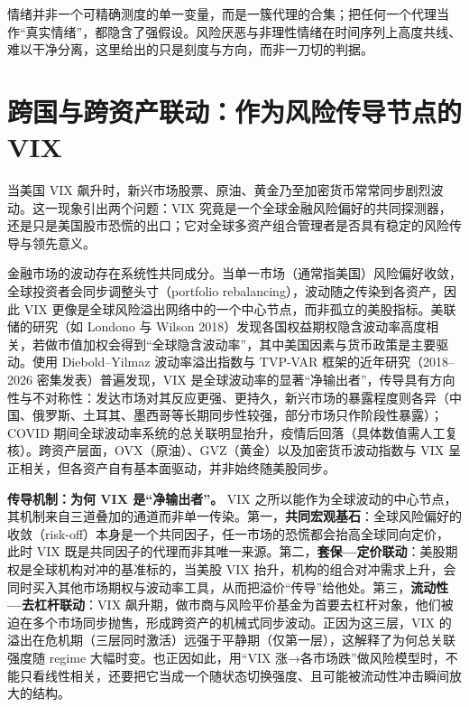 \documentclass[11pt,a4paper]{ctexart}
\begin{document}
情绪并非一个可精确测度的单一变量，而是一簇代理的合集；把任何一个代理当作“真实情绪”，都隐含了强假设。风险厌恶与非理性情绪在时间序列上高度共线、难以干净分离，这里给出的只是刻度与方向，而非一刀切的判据。

\section{跨国与跨资产联动：作为风险传导节点的 VIX}

当美国 VIX 飙升时，新兴市场股票、原油、黄金乃至加密货币常常同步剧烈波动。这一现象引出两个问题：VIX 究竟是一个全球金融风险偏好的共同探测器，还是只是美国股市恐慌的出口；它对全球多资产组合管理者是否具有稳定的风险传导与领先意义。

金融市场的波动存在系统性共同成分。当单一市场（通常指美国）风险偏好收敛，全球投资者会同步调整头寸（portfolio rebalancing），波动随之传染到各资产，因此 VIX 更像是全球风险溢出网络中的一个中心节点，而非孤立的美股指标。美联储的研究（如 Londono 与 Wilson 2018）发现各国权益期权隐含波动率高度相关，若做市值加权会得到“全球隐含波动率”，其中美国因素与货币政策是主要驱动。使用 Diebold–Yilmaz 波动率溢出指数与 TVP-VAR 框架的近年研究（2018–2026 密集发表）普遍发现，VIX 是全球波动率的显著“净输出者”，传导具有方向性与不对称性：发达市场对其反应更强、更持久，新兴市场的暴露程度则各异（中国、俄罗斯、土耳其、墨西哥等长期同步性较强，部分市场只作阶段性暴露）；COVID 期间全球波动率系统的总关联明显抬升，疫情后回落（具体数值需人工复核）。跨资产层面，OVX（原油）、GVZ（黄金）以及加密货币波动指数与 VIX 呈正相关，但各资产自有基本面驱动，并非始终随美股同步。

\textbf{传导机制：为何 VIX 是“净输出者”。} VIX 之所以能作为全球波动的中心节点，其机制来自三道叠加的通道而非单一传染。第一，\textbf{共同宏观基石}：全球风险偏好的收敛（risk-off）本身是一个共同因子，任一市场的恐慌都会抬高全球同向定价，此时 VIX 既是共同因子的代理而非其唯一来源。第二，\textbf{套保—定价联动}：美股期权是全球机构对冲的基准标的，当美股 VIX 抬升，机构的组合对冲需求上升，会同时买入其他市场期权与波动率工具，从而把溢价“传导”给他处。第三，\textbf{流动性—去杠杆联动}：VIX 飙升期，做市商与风险平价基金为首要去杠杆对象，他们被迫在多个市场同步抛售，形成跨资产的机械式同步波动。正因为这三层，VIX 的溢出在危机期（三层同时激活）远强于平静期（仅第一层），这解释了为何总关联强度随 regime 大幅时变。也正因如此，用“VIX 涨→各市场跌”做风险模型时，不能只看线性相关，还要把它当成一个随状态切换强度、且可能被流动性冲击瞬间放大的结构。
\end{document}

